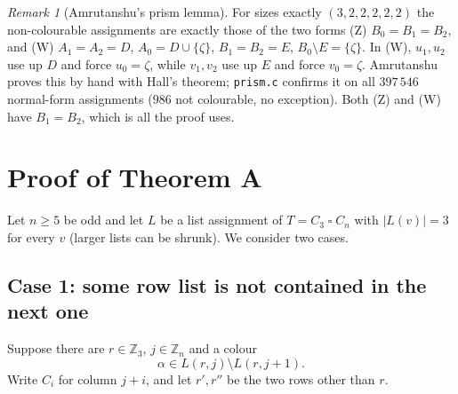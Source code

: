 \documentclass[11pt]{article}
\theoremstyle{plain}
\theoremstyle{definition}
\theoremstyle{remark}
\newtheorem{remark}[theorem]{Remark}
\newcommand{\T}{\mathbin{\square}}
\newcommand{\Z}{\mathbb{Z}}
\begin{document}
\begin{remark}[Amrutanshu's prism lemma]
For sizes exactly $(3,2,2,2,2,2)$ the non-colourable assignments are exactly those of the two
forms (Z) $B_0 = B_1 = B_2$, and (W) $A_1 = A_2 = D$, $A_0 = D \cup \{\zeta\}$, $B_1 = B_2 = E$,
$B_0 \setminus E = \{\zeta\}$. In (W), $u_1, u_2$ use up $D$ and force $u_0 = \zeta$, while
$v_1, v_2$ use up $E$ and force $v_0 = \zeta$. Amrutanshu proves this by hand with Hall's
theorem; \texttt{prism.c} confirms it on all $397\,546$ normal-form assignments ($986$ not
colourable, no exception). Both (Z) and (W) have $B_1 = B_2$, which is all the proof uses.
\end{remark}

\section{Proof of Theorem A}\label{sec:proof}

Let $n \ge 5$ be odd and let $L$ be a list assignment of $T = C_3 \T C_n$ with $|L(v)| = 3$ for
every $v$ (larger lists can be shrunk). We consider two cases.

\subsection*{Case 1: some row list is not contained in the next one}

Suppose there are $r \in \Z_3$, $j \in \Z_n$ and a colour
\[
\alpha \in L(r, j) \setminus L(r, j+1).
\]
Write $C_i$ for column $j + i$, and let $r', r''$ be the two rows other than $r$.
\end{document}

